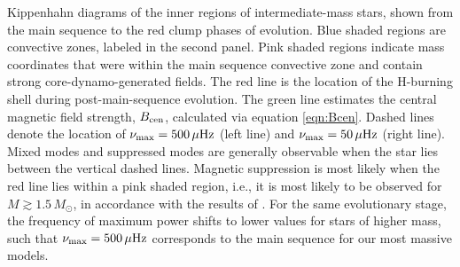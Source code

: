 \label{fig:DipoleHist}
Kippenhahn diagrams of the inner regions of intermediate-mass stars, shown from the main sequence to the red clump phases of evolution. Blue shaded regions are convective zones, labeled in the second panel. Pink shaded regions indicate mass coordinates that were within the main sequence convective zone and contain strong core-dynamo-generated fields. The red line is the location of the H-burning shell during post-main-sequence evolution. The green line estimates the central magnetic field strength, $B_{\rm cen}$, calculated via equation \ref{eqn:Bcen}. Dashed lines denote the location of $\nu_{\rm max} = 500 \, \mu{\rm Hz}$ (left line) and $\nu_{\rm max} = 50 \, \mu{\rm Hz}$ (right line). Mixed modes and suppressed modes are generally observable when the star lies between the vertical dashed lines. Magnetic suppression is most likely when the red line lies within a pink shaded region, i.e., it is most likely to be observed for $M \gtrsim 1.5 \, M_\odot$, in accordance with the results of \cite{Stello_2016}. For the same evolutionary stage, the frequency of maximum power shifts to lower values for stars of higher mass, such that $\nu_{\rm max} = 500 \, \mu{\rm Hz}$ corresponds to the main sequence for our most massive models.